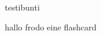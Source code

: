 \documentclass[class=article, crop=false]{standalone}
\begin{document}
\begin{zettel}{testibunti}
\begin{flashcard}[0tiuxpo8]{hallo frodo}
	eine flashcard
\end{flashcard}

\end{zettel}
\end{document}
